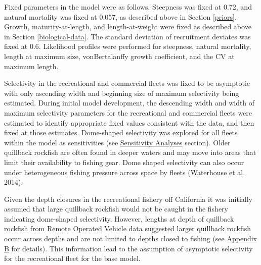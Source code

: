 \documentclass[11pt,
  english,
  letterpaper,
]{article}
\begin{document}
\leavevmode\tagmcend\tagstructend\par


Fixed parameters in the model were as follows. Steepness was fixed at 0.72, and natural mortality was fixed at 0.057, as described above in Section \ref{priors}. Growth, maturity-at-length, and length-at-weight were fixed as described above in Section \ref{biological-data}. The standard deviation of recruitment deviates was fixed at 0.6. Likelihood profiles were performed for steepness, natural mortality, length at maximum size, vonBertalanffy growth coefficient, and the CV at maximum length.

\leavevmode\tagmcend\tagstructend\par


Selectivity in the recreational and commercial fleets was fixed to be asymptotic with only ascending width and beginning size of maximum selectivity being estimated. During initial model development, the descending width and width of maximum selectivity parameters for the recreational and commercial fleets were estimated to identify appropriate fixed values consistent with the data, and then fixed at those estimates. Dome-shaped selectivity was explored for all fleets within the model as sensitivities (see {\protect\hyperlink{sensitivity-analyses}{Sensitivity Analyses}\leavevmode\tagmcend\tagstructend} section). Older quillback rockfish are often found in deeper waters and may move into areas that limit their availability to fishing gear. Dome shaped selectivity can also occur under heterogeneous fishing pressure across space by fleets {(Waterhouse et al. 2014)\leavevmode\tagmcend\tagstructend}.

\leavevmode\tagmcend\tagstructend\par


Given the depth closures in the recreational fishery off California it was initially assumed that large quillback rockfish would not be caught in the fishery indicating dome-shaped selectivity. However, lengths at depth of quillback rockfish from Remote Operated Vehicle data suggested larger quillback rockfish occur across depths and are not limited to depths closed to fishing (see {\protect\hyperlink{append_b}{Appendix B}\leavevmode\tagmcend\tagstructend} for details). This information lead to the assumption of asymptotic selectivity for the recreational fleet for the base model.
\end{document}
